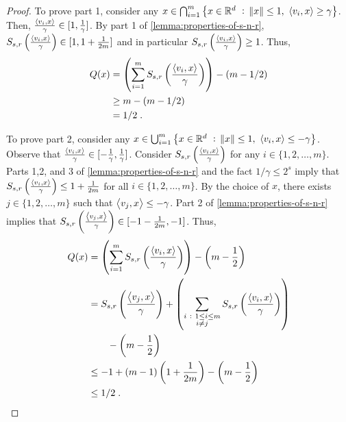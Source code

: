 \begin{proof}
To prove part 1, consider any $x \in \bigcap_{i=1}^m \left\{ x \in \mathbb{R}^d ~:~ \norm{x} \le 1, \
\left\langle v_i, x \right\rangle \ge \gamma \right\}$. Then, $\frac{\left\langle v_i, x \right\rangle}{\gamma} \in [1,
\frac{1}{\gamma}]$. By part 1 of \autoref{lemma:properties-of-s-n-r},
$S_{s,r}\left(\frac{\left\langle v_i, x \right\rangle}{\gamma}\right) \in [1, 1 + \frac{1}{2m}]$ and
in particular $S_{s,r}\left(\frac{\left\langle v_i, x \right\rangle}{\gamma}\right) \ge 1$. Thus,
\begin{align*}
Q(x)
& = \left( \sum_{i=1}^m S_{s,r}\left(\frac{\left\langle v_i, x \right\rangle}{\gamma}\right) \right) - (m - 1/2) \\
& \ge m - (m - 1/2) \\
& = 1/2 \; .
\end{align*}

To prove part 2, consider any $x \in \bigcup_{i=1}^m \left\{ x \in \mathbb{R}^d ~:~
\norm{x} \le 1, \ \left\langle v_i, x \right\rangle \le - \gamma \right\}$. Observe that
$\frac{\left\langle v_i, x \right\rangle}{\gamma} \in [-\frac{1}{\gamma}, \frac{1}{\gamma}]$. Consider
$S_{s,r}\left(\frac{\left\langle v_i, x \right\rangle}{\gamma}\right)$ for any $i \in
\{1,2,\dots,m\}$. Parts 1,2, and 3 of \autoref{lemma:properties-of-s-n-r}
and the fact $1/\gamma \le 2^s$ imply that
$S_{s,r}\left(\frac{\left\langle v_i, x \right\rangle}{\gamma}\right) \le 1 +
\frac{1}{2m}$ for all $i \in \{1,2,\dots,m\}$. By the choice of $x$, there
exists $j \in \{1,2,\dots,m\}$ such that $\left\langle v_j, x \right\rangle \le - \gamma$. Part 2 of
\autoref{lemma:properties-of-s-n-r} implies that
$S_{s,r}\left(\frac{\left\langle v_j, x \right\rangle}{\gamma}\right) \in [-1-\frac{1}{2m},-1]$. Thus,
\begin{align*}
Q(x)
& = \left( \sum_{i=1}^m S_{s,r}\left( \frac{\left\langle v_i, x \right\rangle}{\gamma} \right) \right) - \left(m - \frac{1}{2} \right) \\
& = S_{s,r}\left( \frac{\left\langle v_j, x \right\rangle}{\gamma} \right) + \left( \sum_{\substack{i ~:~ 1 \le i \le m \\ i \neq j}} S_{s,r}\left( \frac{\left\langle v_i, x \right\rangle}{\gamma} \right) \right)  \\
& \qquad - \left(m - \frac{1}{2} \right) \\
& \le -1 + (m-1) \left( 1 + \frac{1}{2m} \right) - \left(m - \frac{1}{2} \right) \\
& \le 1/2 \; .
\end{align*}
\end{proof}

